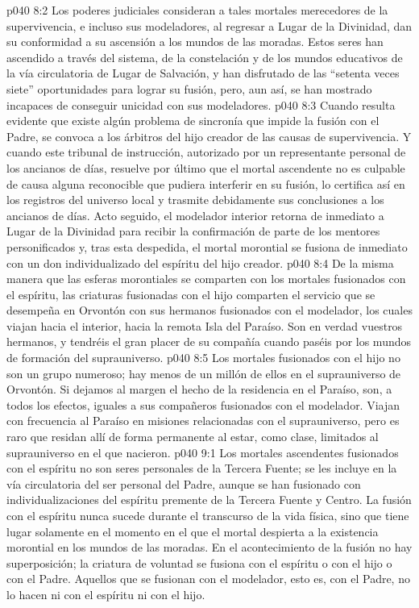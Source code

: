 \vs p040 8:2 Los poderes judiciales consideran a tales mortales merecedores de la supervivencia, e incluso sus modeladores, al regresar a Lugar de la Divinidad, dan su conformidad a su ascensión a los mundos de las moradas. Estos seres han ascendido a través del sistema, de la constelación y de los mundos educativos de la vía circulatoria de Lugar de Salvación, y han disfrutado de las “setenta veces siete” oportunidades para lograr su fusión, pero, aun así, se han mostrado incapaces de conseguir unicidad con sus modeladores.
\vs p040 8:3 Cuando resulta evidente que existe algún problema de sincronía que impide la fusión con el Padre, se convoca a los árbitros del hijo creador de las causas de supervivencia. Y cuando este tribunal de instrucción, autorizado por un representante personal de los ancianos de días, resuelve por último que el mortal ascendente no es culpable de causa alguna reconocible que pudiera interferir en su fusión, lo certifica así en los registros del universo local y trasmite debidamente sus conclusiones a los ancianos de días. Acto seguido, el modelador interior retorna de inmediato a Lugar de la Divinidad para recibir la confirmación de parte de los mentores personificados y, tras esta despedida, el mortal morontial se fusiona de inmediato con un don individualizado del espíritu del hijo creador.
\vs p040 8:4 \pc De la misma manera que las esferas morontiales se comparten con los mortales fusionados con el espíritu, las criaturas fusionadas con el hijo comparten el servicio que se desempeña en Orvontón con sus hermanos fusionados con el modelador, los cuales viajan hacia el interior, hacia la remota Isla del Paraíso. Son en verdad vuestros hermanos, y tendréis el gran placer de su compañía cuando paséis por los mundos de formación del suprauniverso.
\vs p040 8:5 Los mortales fusionados con el hijo no son un grupo numeroso; hay menos de un millón de ellos en el suprauniverso de Orvontón. Si dejamos al margen el hecho de la residencia en el Paraíso, son, a todos los efectos, iguales a sus compañeros fusionados con el modelador. Viajan con frecuencia al Paraíso en misiones relacionadas con el suprauniverso, pero es raro que residan allí de forma permanente al estar, como clase, limitados al suprauniverso en el que nacieron.
\vs p040 9:1 Los mortales ascendentes fusionados con el espíritu no son seres personales de la Tercera Fuente; se les incluye en la vía circulatoria del ser personal del Padre, aunque se han fusionado con individualizaciones del espíritu premente de la Tercera Fuente y Centro. La fusión con el espíritu nunca sucede durante el transcurso de la vida física, sino que tiene lugar solamente en el momento en el que el mortal despierta a la existencia morontial en los mundos de las moradas. En el acontecimiento de la fusión no hay superposición; la criatura de voluntad se fusiona con el espíritu o con el hijo o con el Padre. Aquellos que se fusionan con el modelador, esto es, con el Padre, no lo hacen ni con el espíritu ni con el hijo.
